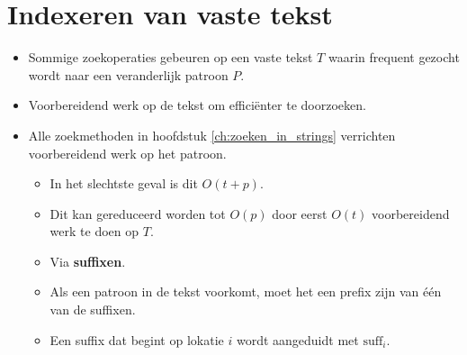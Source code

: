 \newcommand{\suffix}[1]{$\text{suff}_{#1}$}

\chapter{Indexeren van vaste tekst}
\begin{itemize}
    \item Sommige zoekoperaties gebeuren op een vaste tekst $T$ waarin frequent gezocht wordt naar een veranderlijk patroon $P$.
    \item Voorbereidend werk op de tekst om efficiënter te doorzoeken.
    \item Alle zoekmethoden in hoofdstuk \ref{ch:zoeken_in_strings} verrichten voorbereidend werk op het patroon.
    \begin{itemize}
        \item In het slechtste geval is dit $O(t + p)$.
        \item Dit kan gereduceerd worden tot $O(p)$ door eerst $O(t)$ voorbereidend werk te doen op $T$.
        \item Via \textbf{suffixen}.
        \item Als een patroon in de tekst voorkomt, moet het een prefix zijn van één van de suffixen.
        \item Een suffix dat begint op lokatie $i$ wordt aangeduidt met \suffix{i}.
    \end{itemize}
\end{itemize}


